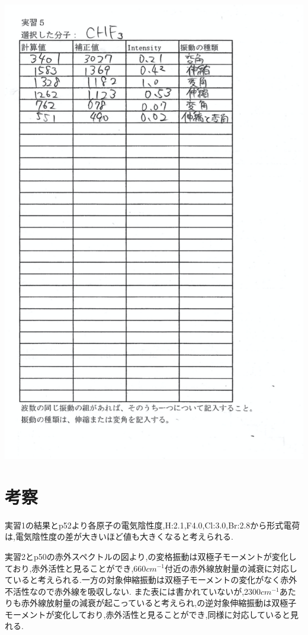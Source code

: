 \documentclass[a4j,10pt,dvipdfmx]{jarticle}
\begin{document}
  \begin{center}
    \includegraphics[width=15cm]{hyou2.png}
  \end{center}
  \section{考察}
  実習1の結果と\cite{a}p52より各原子の電気陰性度,H:2.1,F4.0,Cl:3.0,Br:2.8から形式電荷は,電気陰性度の差が大きいほど値も大きくなると考えられる.

  実習2と\cite{a}p50の赤外スペクトルの図より,の変格振動は双極子モーメントが変化しており,赤外活性と見ることができ,660$cm^{-1}$付近の赤外線放射量の減衰に対応していると考えられる.一方の対象伸縮振動は双極子モーメントの変化がなく赤外不活性なので赤外線を吸収しない.
  また表には書かれていないが,2300$cm^{-1}$あたりも赤外線放射量の減衰が起こっていると考えられ,の逆対象伸縮振動は双極子モーメントが変化しており,赤外活性と見ることができ,同様に対応していると見れる.
\end{document}
